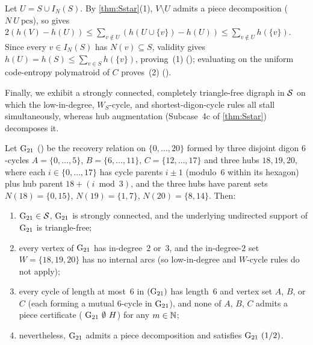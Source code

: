 \begin{outline}
Let $U = S \cup I_N(S)$. By \cref{thm:Sstar}(1), $V \setminus U$ admits a piece decomposition ( $N\ U\ \mathrm{pcs}$),
so  gives $2(h(V) - h(U)) \le \sum_{v \notin U} (h(U \cup \{v\}) - h(U)) \le \sum_{v \notin U}
h(\{v\})$. Since every $v \in I_N(S)$ has $N(v) \subseteq S$, validity gives $h(U) = h(S) \le \sum_{v \in S} h(\{v\})$,
proving~(1) (); evaluating on the uniform code-entropy polymatroid of $C$ proves~(2)
().
\end{outline}

Finally, we exhibit a strongly connected, completely triangle-free digraph in $\mathcal{S}$ on which the low-in-degree,
$W_S$-cycle, and shortest-digon-cycle rules all stall simultaneously, whereas hub augmentation (Subcase~4c of
\cref{thm:Sstar}) decomposes it.

\begin{proposition}\label{prop:G21}
Let $\mathrm{G}_{21}$ () be the recovery relation on $\{0, \dots, 20\}$ formed by three disjoint digon $6$-cycles
$A = \{0,\dots,5\}$, $B = \{6,\dots,11\}$, $C = \{12,\dots,17\}$ and three hubs $18, 19, 20$, where each $i \in \{0,\dots,17\}$
has cycle parents $i \pm 1$ (modulo~$6$ within its hexagon) plus hub parent $18 + (i \bmod 3)$, and the three hubs have
parent sets $N(18) = \{0, 15\}$, $N(19) = \{1, 7\}$, $N(20) = \{8, 14\}$. Then:
\begin{enumerate}
\item $\mathrm{G}_{21} \in \mathcal{S}$, $\mathrm{G}_{21}$ is strongly connected, and the underlying undirected support of $\mathrm{G}_{21}$ is triangle-free;
\item every vertex of $\mathrm{G}_{21}$ has in-degree~$2$ or~$3$, and the in-degree-$2$ set $W = \{18, 19, 20\}$ has no internal arcs
  (so low-in-degree and $W$-cycle rules do not apply);
\item every cycle of length at most~$6$ in $(\mathrm{G}_{21})$ has length~$6$ and vertex set $A$, $B$, or $C$ (each
  forming a mutual $6$-cycle in $\mathrm{G}_{21}$), and none of $A$, $B$, $C$ admits a piece certificate (
  $\Gto\ \emptyset\ H$) for any $m \in \mathbb{N}$;
\item nevertheless, $\mathrm{G}_{21}$ admits a piece decomposition and satisfies  $\Gto\ (1/2)$.
\end{enumerate}
\end{proposition}

